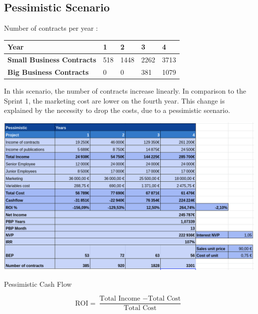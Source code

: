 \documentclass[./main.tex]{subfiles}
\begin{document}
\subsection{Pessimistic Scenario}
Number of contracts per year : 
\begin{table}[H]
	\centering
\begin{tabular}{|l|l|l|l|l|}
\hline
\textbf{Year}                     & 1  & 2   & 3   & 4   \\ \hline
\textbf{Small Business Contracts} & 518 & 1448 & 2262 & 3713 \\ \hline
\textbf{Big Business Contracts}   & 0  & 0   & 381  & 1079 \\ \hline
\end{tabular}
\end{table}
In this scenario, the number of contracts increase linearly.
In comparison to the Sprint 1, the marketing cost are lower on the fourth year. This change is explained by the necessity to drop the costs, due to a pessimistic scenario.
\begin{table}[H]
	\centering
	\includegraphics[width=14cm]{img/pessimistic.png}
	\caption{Pessimistic Cash Flow}
	\label{tab:pessimistic}
\end{table}
\[
\textrm{ROI} = \frac{\textrm{Total Income }- \textrm{Total Cost}}{\textrm{Total Cost}}
\]
\end{document}
